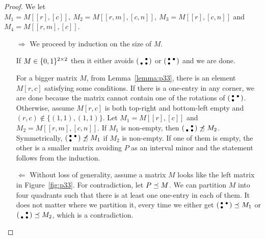 \begin{proof}
We let $M_1=M[[r],[c]],\ M_2=M[[r,m],[c,n]],\ M_3=M[[r],[c,n]]$ and $M_4=M[[r,m],[c]]$.
\begin{itemize}
	\item[$\Rightarrow$] We proceed by induction on the size of $M$.

If $M\in\{0,1\}^{2\times2}$ then it either avoids $\left(\begin{smallmatrix} &\bullet\\\bullet&\bullet\end{smallmatrix}\right)$ or $\left(\begin{smallmatrix}\bullet&\bullet\\\bullet& \end{smallmatrix}\right)$ and we are done.

For a bigger matrix $M$, from Lemma~\ref{lemma:p33}, there is an element $M[r,c]$ satisfying some conditions. If there is a one-entry in any corner, we are done because the matrix cannot contain one of the rotations of $\left(\begin{smallmatrix}\bullet&\bullet\\\bullet& \end{smallmatrix}\right)$. Otherwise, assume $M[r,c]$ is both top-right and bottom-left empty and $(r,c)\not\in\{(1,1),(1,1)\}$. Let $M_1=M[[r],[c]]$ and $M_2=M[[r,m],[c,n]]$. If $M_1$ is non-empty, then $\left(\begin{smallmatrix} &\bullet\\\bullet&\bullet\end{smallmatrix}\right)\not\preceq M_2$. Symmetrically, $\left(\begin{smallmatrix}\bullet&\bullet\\\bullet& \end{smallmatrix}\right)\not\preceq M_1$ if $M_2$ is non-empty. If one of them is empty, the other is a smaller matrix avoiding $P$ as an interval minor and the statement follows from the induction.
	\item[$\Leftarrow$] Without loss of generality, assume a matrix $M$ looks like the left matrix in Figure~\ref{fig:p33}. For contradiction, let $P\preceq M$. We can partition $M$ into four quadrants such that there is at least one one-entry in each of them. It does not matter where we partition it, every time we either get $\left(\begin{smallmatrix}\bullet&\bullet\\\bullet& \end{smallmatrix}\right)\preceq M_1$ or $\left(\begin{smallmatrix} &\bullet\\\bullet&\bullet\end{smallmatrix}\right)\preceq M_2$, which is a contradiction. \qedhere
\end{itemize}
\end{proof}

